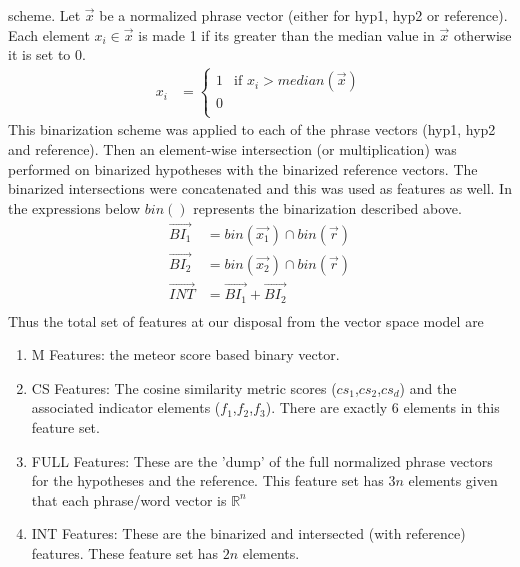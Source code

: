 \documentclass[11pt]{article}
\begin{document}
scheme. Let $\vec{x}$ be a normalized phrase vector (either for hyp1, hyp2 or
reference). Each element $x_i \in \vec{x}$ is made 1 if its greater than the
median value in $\vec{x}$ otherwise it is set to 0.
\begin{align*}
x_i &= \begin{cases} 1 &\mbox{if } x_i > median(\vec{x})\\
0\\
\end{cases}
\end{align*}
This binarization scheme was applied to each of the phrase vectors (hyp1, hyp2
and reference). Then an element-wise intersection (or multiplication) was
performed on binarized hypotheses with the binarized reference vectors. The
binarized intersections were concatenated and this was used as features as well.
In the expressions below $bin()$ represents the binarization described above.
\begin{align*}
\vec{BI_1} &= bin(\vec{x_1}) \cap bin(\vec{r})\\
\vec{BI_2} &= bin(\vec{x_2}) \cap bin(\vec{r})\\
\vec{INT} &= \vec{BI_1} + \vec{BI_2}\\
\end{align*}
Thus the total set of features at our disposal from the vector space model are
\begin{enumerate}
  \item M Features: the meteor score based binary vector.
  \item CS Features: The cosine similarity metric scores ($cs_1$,$cs_2$,$cs_d$)
  and the associated indicator elements ($f_1$,$f_2$,$f_3$). There are exactly 6
  elements in this feature set.
  \item FULL Features: These are the 'dump' of the full normalized phrase
  vectors for the hypotheses and the reference. This feature set has $3n$
  elements given that each phrase/word vector is $\mathbb{R}^n$
  \item INT Features: These are the binarized and intersected (with reference)
  features. These feature set has $2n$ elements.
\end{enumerate}
\end{document}
